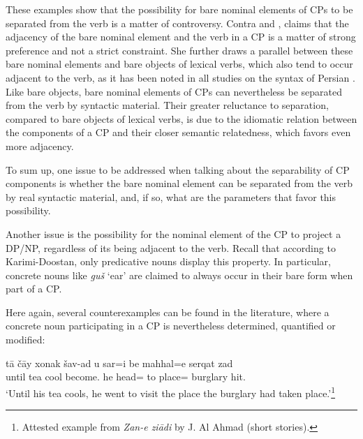 \documentclass[output=paper]{langsci/langscibook}
\begin{document}
These examples show that the possibility for bare nominal elements of CPs to be separated from the verb is a matter of controversy. Contra \citet{Goldberg1996} and \citet{Karimi-Doostan1997,Karimi-Doostan:2011}, \citet{Samvelian2012} claims that the adjacency of the bare nominal element and the verb in a CP is a matter of strong preference and not a strict constraint. She further draws a parallel between these bare nominal elements and bare objects of lexical verbs, which also tend to occur adjacent to the verb, as it has been noted in all studies on the syntax of Persian \citep[][among many others]{dabir1997compound,givi,ghomeshi1996phd,lazard82,mahootian97,Samvelian2001,Karimi2003}. 
Like bare objects, bare nominal elements of CPs can nevertheless be separated from the verb by syntactic material. Their greater reluctance to separation, compared to bare objects of lexical verbs, is due to the idiomatic relation between the components of a CP and their closer semantic relatedness, which favors even more adjacency. 

To sum up, one issue to be addressed when talking about the separability of CP components is whether the bare nominal element can be separated from the verb by real syntactic material, and, if so, what are the parameters that favor this possibility. 

Another issue is the possibility for the nominal element of the CP to project a DP/NP, regardless of its being adjacent to the verb. Recall that according to Karimi-Doostan, only predicative nouns display this property. In particular, concrete nouns like \textit{gu\v{s}} `ear' are claimed to always occur in their bare form when part of a CP.

Here again, several counterexamples can be found in the literature, where a concrete noun participating in a CP is nevertheless determined, quantified or modified:

\begin{exe}
	\ex\label{samvelian-concrete}
	\gll t\=a \v{c}\=ay xonak \v{s}av-ad u sar=i be mahhal=e serqat zad \\
	until tea cool become. he head=  to place= burglary hit.\\
	\glt `Until his tea cools, he went to visit the place the burglary had taken place.'\footnote{Attested example from \textit{Zan-e zi\=adi} by J. Al Ahmad (short stories).} 	\hfill \citep[][p.~85, ex.~68]{Samvelian2012}
\end{exe}
\end{document}
